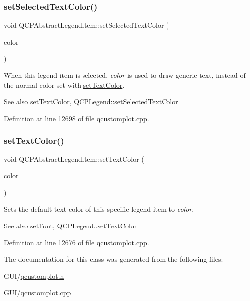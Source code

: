 \subsubsection{\texorpdfstring{set\+Selected\+Text\+Color()}{setSelectedTextColor()}}
{\footnotesize\ttfamily void Q\+C\+P\+Abstract\+Legend\+Item\+::set\+Selected\+Text\+Color (\begin{DoxyParamCaption}\item[{const Q\+Color \&}]{color }\end{DoxyParamCaption})}

When this legend item is selected, {\itshape color} is used to draw generic text, instead of the normal color set with \hyperlink{class_q_c_p_abstract_legend_item_a6ebace6aaffaedcdab2d74e88acc2d1e}{set\+Text\+Color}.

\begin{DoxySeeAlso}{See also}
\hyperlink{class_q_c_p_abstract_legend_item_a6ebace6aaffaedcdab2d74e88acc2d1e}{set\+Text\+Color}, \hyperlink{class_q_c_p_legend_a7674dfc7a1f30e1abd1018c0ed45e0bc}{Q\+C\+P\+Legend\+::set\+Selected\+Text\+Color} 
\end{DoxySeeAlso}


Definition at line 12698 of file qcustomplot.\+cpp.

\mbox{\label{class_q_c_p_abstract_legend_item_a6ebace6aaffaedcdab2d74e88acc2d1e}} 
\subsubsection{\texorpdfstring{set\+Text\+Color()}{setTextColor()}}
{\footnotesize\ttfamily void Q\+C\+P\+Abstract\+Legend\+Item\+::set\+Text\+Color (\begin{DoxyParamCaption}\item[{const Q\+Color \&}]{color }\end{DoxyParamCaption})}

Sets the default text color of this specific legend item to {\itshape color}.

\begin{DoxySeeAlso}{See also}
\hyperlink{class_q_c_p_abstract_legend_item_a409c53455d8112f71d70c0c43eb10265}{set\+Font}, \hyperlink{class_q_c_p_legend_ae1eb239ff4a4632fe1b6c3e668d845c6}{Q\+C\+P\+Legend\+::set\+Text\+Color} 
\end{DoxySeeAlso}


Definition at line 12676 of file qcustomplot.\+cpp.



The documentation for this class was generated from the following files\+:\begin{DoxyCompactItemize}
\item 
G\+U\+I/\hyperlink{qcustomplot_8h}{qcustomplot.\+h}\item 
G\+U\+I/\hyperlink{qcustomplot_8cpp}{qcustomplot.\+cpp}\end{DoxyCompactItemize}
